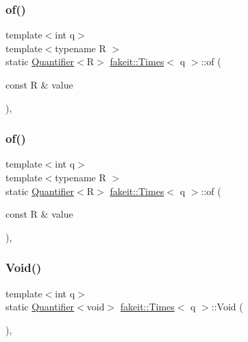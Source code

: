 \subsubsection{\texorpdfstring{of()}{of()}\hspace{0.1cm}{\footnotesize\ttfamily [8/9]}}
{\footnotesize\ttfamily template$<$int q$>$ \\
template$<$typename R $>$ \\
static \mbox{\hyperlink{structfakeit_1_1Quantifier}{Quantifier}}$<$R$>$ \mbox{\hyperlink{structfakeit_1_1Times}{fakeit\+::\+Times}}$<$ q $>$\+::of (\begin{DoxyParamCaption}\item[{const R \&}]{value }\end{DoxyParamCaption})\hspace{0.3cm}{\ttfamily [inline]}, {\ttfamily [static]}}

\mbox{\label{structfakeit_1_1Times_a9c53fb71e7c6d2e295a77909bd971193}} 
\subsubsection{\texorpdfstring{of()}{of()}\hspace{0.1cm}{\footnotesize\ttfamily [9/9]}}
{\footnotesize\ttfamily template$<$int q$>$ \\
template$<$typename R $>$ \\
static \mbox{\hyperlink{structfakeit_1_1Quantifier}{Quantifier}}$<$R$>$ \mbox{\hyperlink{structfakeit_1_1Times}{fakeit\+::\+Times}}$<$ q $>$\+::of (\begin{DoxyParamCaption}\item[{const R \&}]{value }\end{DoxyParamCaption})\hspace{0.3cm}{\ttfamily [inline]}, {\ttfamily [static]}}

\mbox{\label{structfakeit_1_1Times_ab473a1b456a5d360aff2fc5c4749ecae}} 
\subsubsection{\texorpdfstring{Void()}{Void()}\hspace{0.1cm}{\footnotesize\ttfamily [1/9]}}
{\footnotesize\ttfamily template$<$int q$>$ \\
static \mbox{\hyperlink{structfakeit_1_1Quantifier}{Quantifier}}$<$void$>$ \mbox{\hyperlink{structfakeit_1_1Times}{fakeit\+::\+Times}}$<$ q $>$\+::Void (\begin{DoxyParamCaption}{ }\end{DoxyParamCaption})\hspace{0.3cm}{\ttfamily [inline]}, {\ttfamily [static]}}

